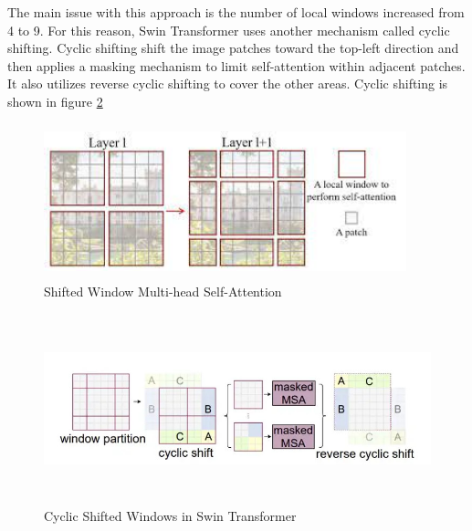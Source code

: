 The main issue with this approach is the number of local windows increased from 4 to 9. For this reason, Swin Transformer uses another mechanism called cyclic shifting. Cyclic shifting shift the image patches toward the top-left direction and then applies a masking mechanism to limit self-attention within adjacent patches. It also utilizes reverse cyclic shifting to cover the other areas. Cyclic shifting is shown in figure \ref{fig:swin cyclic}
\begin{figure}[ht]
\includegraphics[width=10.5cm, height=4.5cm]{images/swin-msa1.jpeg}
\centering
\caption{Shifted Window Multi-head Self-Attention \protect\cite{swin-v1}}
\label{fig:swin shifted}
\end{figure}

\begin{figure}[ht]
\includegraphics[width=13.5cm, height=5.5cm]{images/swin-cyclic-shift.jpg}
\centering
\caption{Cyclic Shifted Windows in Swin Transformer \protect\cite{swin-v1}}
\label{fig:swin cyclic}
\end{figure}

